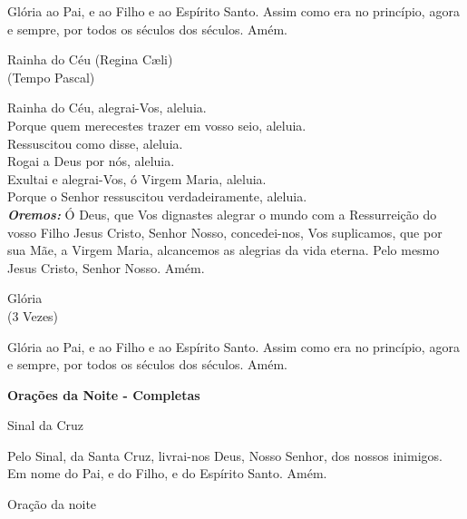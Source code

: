 \documentclass{book}
\begin{document}
\begin{flushleft}
    Glória ao Pai, e ao Filho e ao Espírito Santo. Assim como era no princípio, agora e sempre, por todos os séculos dos séculos. Amém.
\end{flushleft}
\newpage
\begin{center}
    Rainha do Céu (Regina Cæli) \\ \textcolor{VioletRed2}{\scriptsize{(Tempo Pascal)}}
\end{center}
\begin{flushleft}
    \VbarRed{} Rainha do Céu, alegrai-Vos, aleluia. \\
    \RbarRed{} Porque quem merecestes trazer em vosso seio, aleluia. \\
    \VbarRed{} Ressuscitou como disse, aleluia. \\
    \RbarRed{} Rogai a Deus por nós, aleluia. \\
    \hfill{} \break{}
    \VbarRed{} Exultai e alegrai-Vos, ó Virgem Maria, aleluia. \\
    \RbarRed{} Porque o Senhor ressuscitou verdadeiramente, aleluia. \\
    \hfill{} \break{}
    \textbf{\textit{Oremos:}} Ó Deus, que Vos dignastes alegrar o mundo com a Ressurreição do vosso Filho Jesus Cristo, Senhor Nosso, concedei-nos, Vos suplicamos, que por sua Mãe, a Virgem Maria, alcancemos as alegrias da vida eterna. Pelo mesmo Jesus Cristo, Senhor Nosso. Amém.
\end{flushleft}
\begin{center}
    Glória \\ \textcolor{VioletRed2}{\scriptsize{(3 Vezes)}}
\end{center}
\begin{flushleft}
    Glória ao Pai, e ao Filho e ao Espírito Santo. Assim como era no princípio, agora e sempre, por todos os séculos dos séculos. Amém.
\end{flushleft}
\newpage
\begin{center}
    \textbf{Orações da Noite - Completas}
\end{center}
\begin{center}
    Sinal da Cruz
\end{center}
\begin{flushleft}
    Pelo Sinal, \grecrossRed{} da Santa Cruz, livrai-nos Deus, \grecrossRed{} Nosso Senhor, dos nossos \grecrossRed{} inimigos. Em nome do Pai, \grecrossRed{} e do Filho, e do Espírito Santo. Amém.
\end{flushleft}
\begin{center}
    Oração da noite
\end{center}
\end{document}
